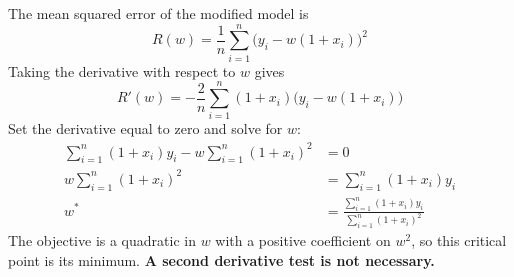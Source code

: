 \documentclass[11pt,twoside]{article}
\begin{document}
\begin{prob}[(16 pts)]
\begin{subprob}
\begin{solution}
The mean squared error of the modified model is
\[
R(w)=\frac1n\sum_{i=1}^n\bigl(y_i-w(1+x_i)\bigr)^2
\]
Taking the derivative with respect to $w$ gives
\[
R'(w)=-\frac2n\sum_{i=1}^n(1+x_i)\bigl(y_i-w(1+x_i)\bigr)
\]
Set the derivative equal to zero and solve for $w$:
\begin{align*}
\sum_{i=1}^n(1+x_i)y_i-w\sum_{i=1}^n(1+x_i)^2&=0\\
w\sum_{i=1}^n(1+x_i)^2&=\sum_{i=1}^n(1+x_i)y_i\\
w^*&=\boxed{\frac{\displaystyle\sum_{i=1}^n(1+x_i)y_i}{\displaystyle\sum_{i=1}^n(1+x_i)^2}}
\end{align*}
The objective is a quadratic in $w$ with a positive coefficient on $w^2$, so this critical point is its minimum. \textbf{A second derivative test is not necessary.}
\end{solution}
\end{subprob}
\end{prob}\clearpage
\end{document}
